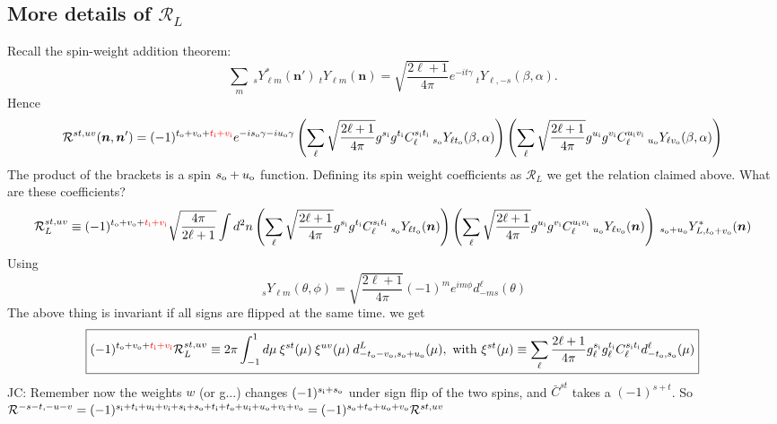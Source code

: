 \documentclass[reprint,prd, superscriptaddress, tightenlines, longbibliography, nofootinbib, eqsecnum, amsfonts, amsmath, floatfix, notitlepage, onecolumn]{revtex4-1}
\newcommand{\si}[0]{{s_{\rm i}}}
\newcommand{\ti}[0]{{t_{\rm i}}}
\newcommand{\ui}[0]{{u_{\rm i}}}
\newcommand{\vi}[0]{{v_{\rm i}}}
\newcommand{\so}[0]{{s_{\rm o}}}
\renewcommand{\to}[0]{{t_{\rm o}}}
\newcommand{\uo}[0]{{u_{\rm o}}}
\newcommand{\vo}[0]{{v_{\rm o}}}
\newcommand{\Ylm}[1]{\:_{#1}Y_{\ell m}}
\newcommand{\Ylms}[1]{\:_{#1}Y^*_{\ell m}}
\newcommand{\red}[1]{\color{red}#1 \color{black} }
\newcommand{\JC}[1]{\color{red}JC: #1\color{black}}
\newcommand{\hn}[0]{\boldsymbol{n}}
\begin{document}
\subsection*{More details of $\mathcal R_L$}
Recall the spin-weight addition theorem:
\begin{equation}
	\sum_m \Ylms {s}(\hn') \Ylm {t} (\hn) =\sqrt{\frac{2\ell + 1}{4\pi}} e^{- i t \gamma} \:_t Y_{\ell, -s}(\beta, \alpha).
\end{equation}
Hence 
\begin{equation}
	\mathcal R^{st,uv}(\hn, \hn') = (-1)^{\to + \vo + \red{\ti + \vi}} e^{-i \so \gamma -i \uo \gamma} \left(\sum_\ell \sqrt{\frac{2\ell + 1}{4\pi}} g^{\si}g^{\ti} C_\ell^{\si \ti} \:_{\so}Y_{\ell \to}(\beta ,\alpha)\right) \left(\sum_\ell \sqrt{\frac{2\ell + 1}{4\pi}} g^{\ui}g^{\vi} C_\ell^{\ui \vi} \:_{\uo}Y_{\ell \vo}(\beta ,\alpha)\right)
\end{equation}
The product of the brackets is a spin $\so + \uo$ function. Defining its spin weight coefficients as $\mathcal R_L$ we get the relation claimed above. What are these coefficients? 
\begin{equation}
	\mathcal R_L^{st,uv} \equiv(-1)^{\to + \vo+ \red{\ti + \vi}} \sqrt{\frac {4\pi}{2\ell + 1}} \int d^2n \left(\sum_\ell \sqrt{\frac{2\ell + 1}{4\pi}} g^{\si}g^{\ti} C_\ell^{\si \ti} \:_{\so}Y_{\ell \to}(\hn)\right) \left(\sum_\ell \sqrt{\frac{2\ell + 1}{4\pi}} g^{\ui}g^{\vi} C_\ell^{\ui \vi} \:_{\uo}Y_{\ell \vo}(\hn)\right)\:_{\so + \uo}Y^*_{L,\to + \vo}(\hn) 
\end{equation}
Using
\begin{equation}
	\boxed{\Ylm s(\theta, \phi) = \sqrt{\frac {2\ell + 1} {4\pi}}(-1)^m e^{i m \phi} d_{-m s}^\ell(\theta) }
\end{equation}
The above thing is invariant if all signs are flipped at the same time.
we get
\begin{equation}
\boxed{
(-1)^{\to + \vo+ \red{\ti + \vi}} \mathcal R_L^{st,uv} \equiv 2\pi  \int_{-1}^1 d \mu \:\xi^{st}(\mu)\:\xi^{uv}(\mu)\: d^L_{-\to - \vo, \so + \uo}(\mu),\textrm{  with } \xi^{st}(\mu) \equiv  \sum_\ell \frac{2\ell + 1}{4\pi}g^\si_\ell g^\ti_\ell C_\ell^{\si \ti} d^\ell_{-\to,\so}(\mu)}
 \end{equation}
 \JC{Remember now the weights $w$ (or g...) changes $(-1)^{\si + \so}$ under sign flip of the two spins, and $\bar C^{st}$ takes a $(-1)^{s + t}$. So $\mathcal R^{-s-t, -u-v} = (-1)^{\si + \ti + \ui + \vi + \si + \so + \ti + \to + \ui + \uo + \vi + \vo } = (-1)^{\so + \to + \uo + \vo }\mathcal R^{st, uv}$ }
\end{document}
